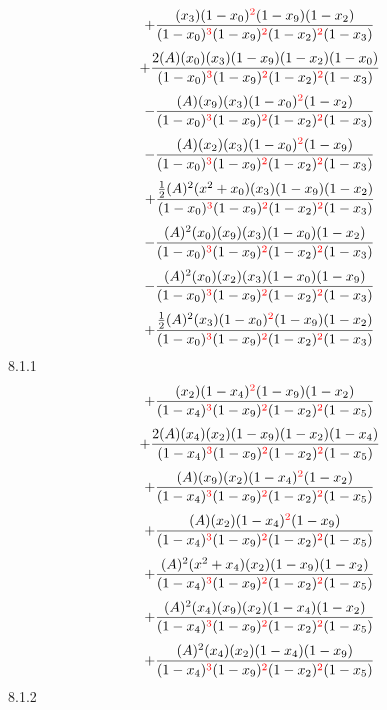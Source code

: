 \documentclass{article}
\begin{document}
\[+\frac{(x_3)(1-x_0)^{\textcolor{red}{2}}(1-x_9)(1-x_2)}{(1-x_0)^{\textcolor{red}{3}}(1-x_9)^{\textcolor{red}{2}}(1-x_2)^{\textcolor{red}{2}}(1-x_3)}\]\[+\frac{2(A)(x_0)(x_3)(1-x_9)(1-x_2)(1-x_0)}{(1-x_0)^{\textcolor{red}{3}}(1-x_9)^{\textcolor{red}{2}}(1-x_2)^{\textcolor{red}{2}}(1-x_3)}\]\[-\frac{(A)(x_9)(x_3)(1-x_0)^{\textcolor{red}{2}}(1-x_2)}{(1-x_0)^{\textcolor{red}{3}}(1-x_9)^{\textcolor{red}{2}}(1-x_2)^{\textcolor{red}{2}}(1-x_3)}\]\[-\frac{(A)(x_2)(x_3)(1-x_0)^{\textcolor{red}{2}}(1-x_9)}{(1-x_0)^{\textcolor{red}{3}}(1-x_9)^{\textcolor{red}{2}}(1-x_2)^{\textcolor{red}{2}}(1-x_3)}\]\[+\frac{\frac{1}{2}(A)^{2}(x^{2}+x_0)(x_3)(1-x_9)(1-x_2)}{(1-x_0)^{\textcolor{red}{3}}(1-x_9)^{\textcolor{red}{2}}(1-x_2)^{\textcolor{red}{2}}(1-x_3)}\]\[-\frac{(A)^{2}(x_0)(x_9)(x_3)(1-x_0)(1-x_2)}{(1-x_0)^{\textcolor{red}{3}}(1-x_9)^{\textcolor{red}{2}}(1-x_2)^{\textcolor{red}{2}}(1-x_3)}\]\[-\frac{(A)^{2}(x_0)(x_2)(x_3)(1-x_0)(1-x_9)}{(1-x_0)^{\textcolor{red}{3}}(1-x_9)^{\textcolor{red}{2}}(1-x_2)^{\textcolor{red}{2}}(1-x_3)}\]\[+\frac{\frac{1}{2}(A)^{2}(x_3)(1-x_0)^{\textcolor{red}{2}}(1-x_9)(1-x_2)}{(1-x_0)^{\textcolor{red}{3}}(1-x_9)^{\textcolor{red}{2}}(1-x_2)^{\textcolor{red}{2}}(1-x_3)}\]
8.1.1
\[+\frac{(x_2)(1-x_4)^{\textcolor{red}{2}}(1-x_9)(1-x_2)}{(1-x_4)^{\textcolor{red}{3}}(1-x_9)^{\textcolor{red}{2}}(1-x_2)^{\textcolor{red}{2}}(1-x_5)}\]\[+\frac{2(A)(x_4)(x_2)(1-x_9)(1-x_2)(1-x_4)}{(1-x_4)^{\textcolor{red}{3}}(1-x_9)^{\textcolor{red}{2}}(1-x_2)^{\textcolor{red}{2}}(1-x_5)}\]\[+\frac{(A)(x_9)(x_2)(1-x_4)^{\textcolor{red}{2}}(1-x_2)}{(1-x_4)^{\textcolor{red}{3}}(1-x_9)^{\textcolor{red}{2}}(1-x_2)^{\textcolor{red}{2}}(1-x_5)}\]\[+\frac{(A)(x_2)(1-x_4)^{\textcolor{red}{2}}(1-x_9)}{(1-x_4)^{\textcolor{red}{3}}(1-x_9)^{\textcolor{red}{2}}(1-x_2)^{\textcolor{red}{2}}(1-x_5)}\]\[+\frac{(A)^{2}(x^{2}+x_4)(x_2)(1-x_9)(1-x_2)}{(1-x_4)^{\textcolor{red}{3}}(1-x_9)^{\textcolor{red}{2}}(1-x_2)^{\textcolor{red}{2}}(1-x_5)}\]\[+\frac{(A)^{2}(x_4)(x_9)(x_2)(1-x_4)(1-x_2)}{(1-x_4)^{\textcolor{red}{3}}(1-x_9)^{\textcolor{red}{2}}(1-x_2)^{\textcolor{red}{2}}(1-x_5)}\]\[+\frac{(A)^{2}(x_4)(x_2)(1-x_4)(1-x_9)}{(1-x_4)^{\textcolor{red}{3}}(1-x_9)^{\textcolor{red}{2}}(1-x_2)^{\textcolor{red}{2}}(1-x_5)}\]
8.1.2
\end{document}
